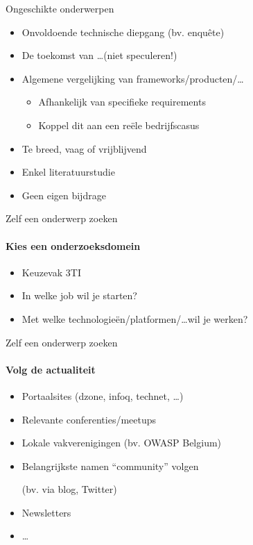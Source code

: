 \documentclass[usenames,dvipsnames]{beamer}
\begin{document}
\begin{frame}{Ongeschikte onderwerpen}

\begin{itemize}
  \item Onvoldoende technische diepgang (bv. enquête)
  \item De toekomst van \ldots (niet speculeren!)
  \item Algemene vergelijking van frameworks/producten/\ldots
  \begin{itemize}
    \item Afhankelijk van specifieke requirements
    \item Koppel dit aan een reële bedrijfscasus
  \end{itemize}
  \item Te breed, vaag of vrijblijvend
  \item Enkel literatuurstudie
  \item Geen eigen bijdrage
\end{itemize}

\end{frame}

\begin{frame}{Zelf een onderwerp zoeken}
  \framesubtitle{Kies een onderzoeksdomein}

  \begin{itemize}
    \item Keuzevak 3TI
    \item In welke job wil je starten?
    \item Met welke technologieën/platformen/\ldots wil je werken?
  \end{itemize}

\end{frame}

\begin{frame}{Zelf een onderwerp zoeken}
  \framesubtitle{Volg de actualiteit}

  \begin{itemize}
    \item Portaalsites (dzone, infoq, technet, \ldots)
    \item Relevante conferenties/meetups
    \item Lokale vakverenigingen (bv. OWASP Belgium)
    \item Belangrijkste namen ``community'' volgen
    
    (bv. via blog, Twitter)
    
    \item Newsletters
    \item \ldots
  \end{itemize}

\end{frame}
\end{document}
